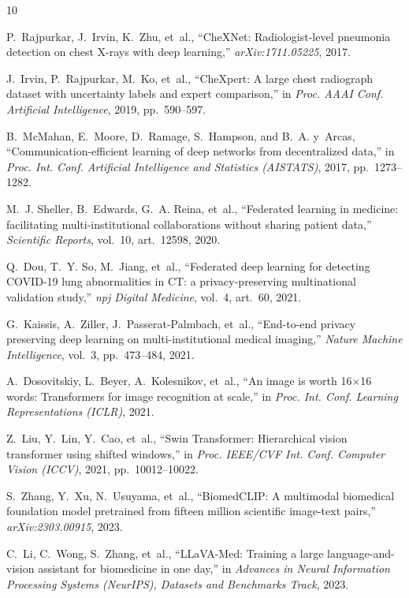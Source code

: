 \documentclass[letterpaper, conference]{IEEEtran}
\begin{document}
\begin{thebibliography}{10}

P.~Rajpurkar, J.~Irvin, K.~Zhu, et~al.,
``CheXNet: Radiologist-level pneumonia detection on chest X-rays with deep learning,''
\emph{arXiv:1711.05225}, 2017.

J.~Irvin, P.~Rajpurkar, M.~Ko, et~al.,
``CheXpert: A large chest radiograph dataset with uncertainty labels and expert comparison,''
in \emph{Proc. AAAI Conf. Artificial Intelligence}, 2019, pp.~590--597.

B.~McMahan, E.~Moore, D.~Ramage, S.~Hampson, and B.~A. y~Arcas,
``Communication-efficient learning of deep networks from decentralized data,''
in \emph{Proc. Int. Conf. Artificial Intelligence and Statistics (AISTATS)}, 2017,
pp.~1273--1282.

M.~J. Sheller, B.~Edwards, G.~A. Reina, et~al.,
``Federated learning in medicine: facilitating multi-institutional collaborations
without sharing patient data,''
\emph{Scientific Reports}, vol.~10, art.~12598, 2020.

Q.~Dou, T.~Y. So, M.~Jiang, et~al.,
``Federated deep learning for detecting COVID-19 lung abnormalities in CT: a
privacy-preserving multinational validation study,''
\emph{npj Digital Medicine}, vol.~4, art.~60, 2021.

G.~Kaissis, A.~Ziller, J.~Passerat-Palmbach, et~al.,
``End-to-end privacy preserving deep learning on multi-institutional medical imaging,''
\emph{Nature Machine Intelligence}, vol.~3, pp.~473--484, 2021.

A.~Dosovitskiy, L.~Beyer, A.~Kolesnikov, et~al.,
``An image is worth 16$\times$16 words: Transformers for image recognition at scale,''
in \emph{Proc. Int. Conf. Learning Representations (ICLR)}, 2021.

Z.~Liu, Y.~Lin, Y.~Cao, et~al.,
``Swin Transformer: Hierarchical vision transformer using shifted windows,''
in \emph{Proc. IEEE/CVF Int. Conf. Computer Vision (ICCV)}, 2021, pp.~10012--10022.

S.~Zhang, Y.~Xu, N.~Usuyama, et~al.,
``BiomedCLIP: A multimodal biomedical foundation model pretrained from fifteen
million scientific image-text pairs,'' \emph{arXiv:2303.00915}, 2023.

C.~Li, C.~Wong, S.~Zhang, et~al.,
``LLaVA-Med: Training a large language-and-vision assistant for biomedicine in one day,''
in \emph{Advances in Neural Information Processing Systems (NeurIPS), Datasets and
Benchmarks Track}, 2023.


\end{thebibliography}
\end{document}
